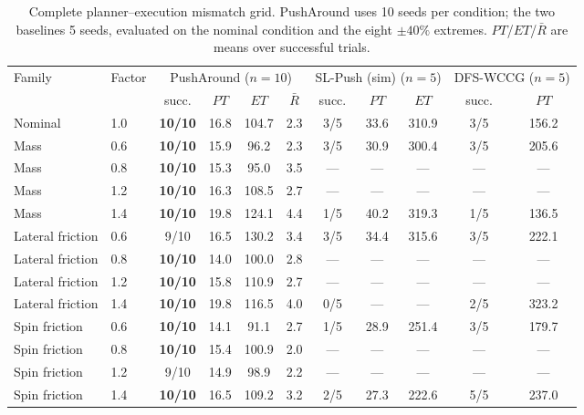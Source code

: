 \documentclass[11pt]{article}
\begin{document}
\begin{table}[!ht]
\centering
\footnotesize
\caption{Complete planner--execution mismatch grid. PushAround uses 10 seeds
per condition; the two baselines 5 seeds, evaluated on the nominal condition
and the eight $\pm40\%$ extremes. $PT$/$ET$/$\bar R$ are means over successful trials.}
\label{tab:mismatch-full}
\footnotesize
\setlength{\tabcolsep}{2.4pt}\renewcommand{\arraystretch}{0.95}
\begin{tabular}{llccccccccc}
\toprule
Family & Factor & \multicolumn{4}{c}{PushAround ($n{=}10$)} & \multicolumn{3}{c}{SL-Push (sim) ($n{=}5$)} & \multicolumn{2}{c}{DFS-WCCG ($n{=}5$)}\\
\cmidrule(lr){3-6}\cmidrule(lr){7-9}\cmidrule(lr){10-11}
 & & succ. & $PT$ & $ET$ & $\bar R$ & succ. & $PT$ & $ET$ & succ. & $PT$\\
\midrule
Nominal            & 1.0 & \textbf{10/10} & 16.8 & 104.7 & 2.3 & 3/5 & 33.6 & 310.9 & 3/5 & 156.2\\
Mass               & 0.6 & \textbf{10/10} & 15.9 & 96.2  & 2.3 & 3/5 & 30.9 & 300.4 & 3/5 & 205.6\\
Mass               & 0.8 & \textbf{10/10} & 15.3 & 95.0  & 3.5 & --- & --- & --- & --- & ---\\
Mass               & 1.2 & \textbf{10/10} & 16.3 & 108.5 & 2.7 & --- & --- & --- & --- & ---\\
Mass               & 1.4 & \textbf{10/10} & 19.8 & 124.1 & 4.4 & 1/5 & 40.2 & 319.3 & 1/5 & 136.5\\
Lateral friction   & 0.6 & 9/10 & 16.5 & 130.2 & 3.4 & 3/5 & 34.4 & 315.6 & 3/5 & 222.1\\
Lateral friction   & 0.8 & \textbf{10/10} & 14.0 & 100.0 & 2.8 & --- & --- & --- & --- & ---\\
Lateral friction   & 1.2 & \textbf{10/10} & 15.8 & 110.9 & 2.7 & --- & --- & --- & --- & ---\\
Lateral friction   & 1.4 & \textbf{10/10} & 19.8 & 116.5 & 4.0 & 0/5 & --- & --- & 2/5 & 323.2\\
Spin friction      & 0.6 & \textbf{10/10} & 14.1 & 91.1  & 2.7 & 1/5 & 28.9 & 251.4 & 3/5 & 179.7\\
Spin friction      & 0.8 & \textbf{10/10} & 15.4 & 100.9 & 2.0 & --- & --- & --- & --- & ---\\
Spin friction      & 1.2 & 9/10 & 14.9 & 98.9  & 2.2 & --- & --- & --- & --- & ---\\
Spin friction      & 1.4 & \textbf{10/10} & 16.5 & 109.2 & 3.2 & 2/5 & 27.3 & 222.6 & 5/5 & 237.0\\

\end{tabular}
\end{table}
\end{document}
